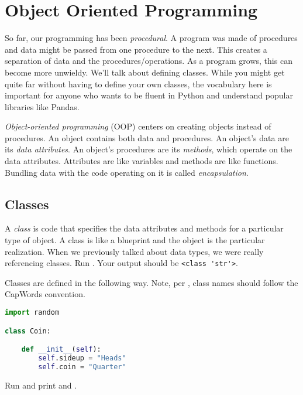 \section{Object Oriented Programming}
\medskip

So far, our programming has been \emph{procedural}. A program was made of procedures and data might be passed from one procedure to the next. This creates a separation of data and the procedures/operations. As a program grows, this can become more unwieldy. We'll talk about defining classes. While you might get quite far without having to define your own classes, the vocabulary here is important for anyone who wants to be fluent in Python and understand popular libraries like Pandas. 

\smallskip
\noindent \emph{Object-oriented programming} (OOP) centers on creating objects instead of procedures. An object contains both data and procedures. An object's data are its \emph{data attributes}. An object's procedures are its \emph{methods}, which operate on the data attributes. Attributes are like variables and methods are like functions. Bundling data with the code operating on it is called \emph{encapsulation}. 
\smallskip 

\subsection{Classes}

A \emph{class} is code that specifies the data attributes and methods for a particular type of object. A class is like a blueprint and the object is the particular realization. When we previously talked about data types, we were really referencing classes. Run . Your output should be \lstinline{<class 'str'>}.

\smallskip
\noindent
Classes are defined in the following way. Note, per , class names should follow the CapWords convention. 

\begin{lstlisting}[language = Python]
import random 

class Coin: 

    def __init__(self):
        self.sideup = "Heads"
        self.coin = "Quarter"
\end{lstlisting}

\smallskip
\noindent Run  and print  and .

